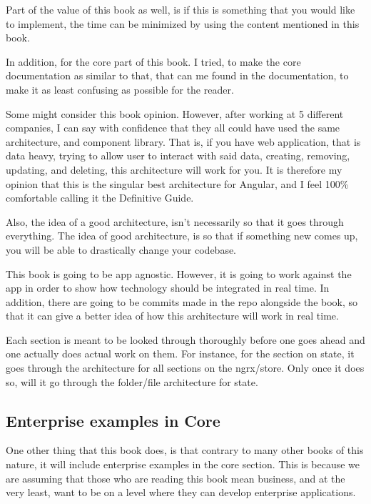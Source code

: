 Part of the value of this book as well, is if this is something that you would
like to implement, the time can be minimized by using the content mentioned
in this book.

In addition, for the core part of this book. I tried, to make the core
documentation as similar to that, that can me found in the documentation, to make
it as least confusing as possible for the reader.

Some might consider this book opinion. However, after working at 5 different
companies, I can say with confidence that they all could have used the same
architecture, and component library. That is, if you have web application, that
is data heavy, trying to allow user to interact with said data, creating,
removing, updating, and deleting, this architecture will work for you. It is
therefore my opinion that this is the singular best architecture for Angular,
and I feel 100\% comfortable calling it the Definitive Guide.

Also, the idea of a good architecture, isn't necessarily so that it goes through
everything. The idea of good architecture, is so that if something new comes up,
you will be able to drastically change your codebase. %

This book is going to be app agnostic. However, it is going to work against the
app in order to show how technology should be integrated in real time. In
addition, there are going to be commits made in the repo alongside the book,
so that it can give a better idea of how this architecture will work in real
time.

Each section is meant to be looked through thoroughly before one goes ahead and
one actually does actual work on them. For instance, for the section on state,
it goes through the architecture for all sections on the ngrx/store. Only once
it does so, will it go through the folder/file architecture for state.

\subsection{Enterprise examples in Core}
One other thing that this book does, is that contrary to many other books of
this nature, it will include enterprise examples in the core section. This is
because we are assuming that those who are reading this book mean business, and 
at the very least, want to be on a level where they can develop enterprise
applications.
